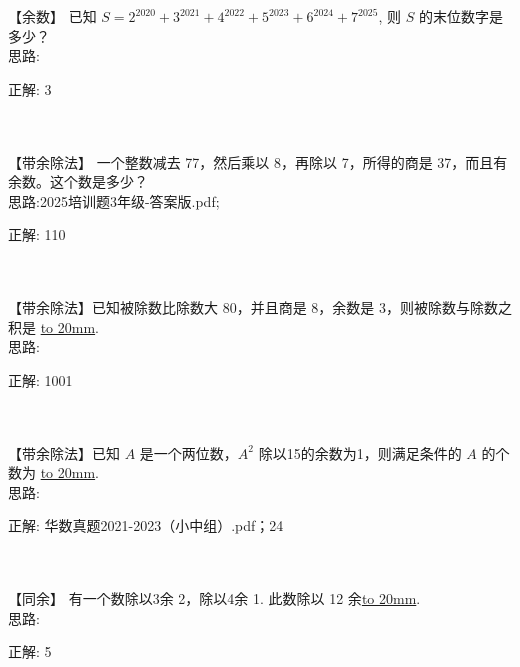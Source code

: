 \item {
    【余数】
    已知 $S = 2^{2020} + 3^{2021} + 4^{2022} + 5^{2023} +6^{2024} + 7^{2025}$, 则 $S$ 的末位数字是多少？
    \ifshowSolution
        \fangsong{}
        \\
        思路:

        正解: 3
    \else
        \\ \\ \\
    \fi
}

\item {
    【带余除法】
    一个整数减去 77，然后乘以 8，再除以 7，所得的商是 37，而且有余数。这个数是多少？
    \ifshowSolution
        \fangsong{}
        \\
        思路:2025培训题3年级-答案版.pdf;

        正解:  110
    \else
        \\ \\ \\
    \fi
}

\item {
    【带余除法】已知被除数比除数大 80，并且商是 8，余数是 3，则被除数与除数之积是 \underline{\hbox to 20mm{}}.
    \ifshowSolution
        \fangsong{}
        \\
        思路:

        正解: 1001
    \else
        \\ \\ \\
    \fi
}

\item {
    【带余除法】已知 $A$ 是一个两位数，$A^2$ 除以15的余数为1，则满足条件的 $A$ 的个数为 \underline{\hbox to 20mm{}}.
    \ifshowSolution
        \fangsong{}
        \\
        思路:

        正解: 华数真题2021-2023（小中组）.pdf；24
    \else
        \\ \\ \\
    \fi
}

\item {
    【同余】
    有一个数除以3余 2，除以4余 1. 此数除以 12 余\underline{\hbox to 20mm{}}.
    \ifshowSolution
        \fangsong{}
        \\
        思路:

        正解: 5
    \else
        \\ \\ \\
    \fi
}


